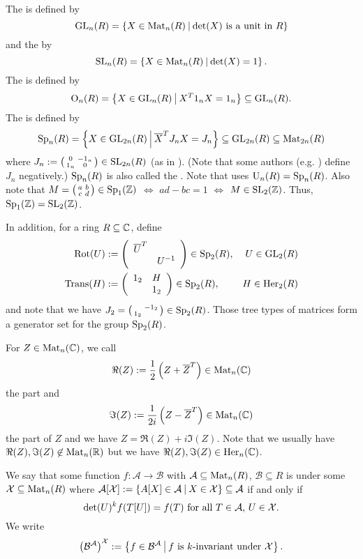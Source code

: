 The  is defined by
\[ \GL_n(R) = \Set{X \in \M_n(R)}{\text{$\det(X)$ is a unit in $R$}} \]
and the  by
\[ \SL_n(R) = \Set{X \in \M_n(R)}{\det(X) = 1} . \] %
The  is defined by
\[ \Orth_n(R) = \Set{X \in \GL_n(R)}{X^T 1_n X = 1_n} \subseteq \GL_n(R) . \] %
The  is defined by
\[ \Sp_n(R) = \Set{X \in \GL_{2n}(R)}{\overline{X}^T J_n X = J_n} \subseteq \GL_{2n}(R) \subseteq \M_{2n}(R) \] %
where $J_n := \left( \begin{smallmatrix} 0 & -1_n \\ 1_n & 0 \end{smallmatrix} \right) \in \operatorname{SL}_{2n}(R)$ (as in \cite{Dern01Herm}). (Note that some authors (e.g. \cite{PoorYuen07Comp}) define $J_n$ negatively.)
$\operatorname{Sp}_n(R)$ is also called the . Note that \cite{Dern01Herm} uses $\operatorname{U}_n(R) = \operatorname{Sp}_n(R)$.
Also note that $M = \left( \begin{smallmatrix} a & b \\ c & d \end{smallmatrix} \right) \in \operatorname{Sp}_1(\mathbb{Z})$ $\Leftrightarrow$ $ad - bc = 1$ $\Leftrightarrow$ $M \in \operatorname{SL}_2(\mathbb{Z})$. Thus, $\operatorname{Sp}_1(\mathbb{Z}) = \operatorname{SL}_2(\mathbb{Z})$. %

In addition, for a ring $R \subseteq \mathbb{C}$, define
\begin{align*}
\operatorname{Rot}(U) & := \left( \begin{array}{cc} \overline{U}^T &  \\  & U^{-1} \end{array} \right) \in \operatorname{Sp}_2(R), & U \in \operatorname{GL}_2(R) \\
\operatorname{Trans}(H) & := \left( \begin{array}{cc} 1_2 & H \\  & 1_2 \end{array} \right) \in \operatorname{Sp}_2(R),  & H \in \operatorname{Her}_2(R)
\end{align*}
and note that we have $J_2 = \left( \begin{smallmatrix}  & -1_2 \\ 1_2 &  \end{smallmatrix} \right) \in \operatorname{Sp}_2(R)$. Those tree types of matrices form a generator set for the group $\operatorname{Sp}_2(R)$.

For $Z \in \operatorname{Mat}_n(\mathbb{C})$, we call
\[ \Re(Z) := \frac{1}{2} \left(Z + \overline{Z}^{T}\right) \in \operatorname{Mat}_n(\mathbb{C}) \]
the  part and
\[ \Im(Z) := \frac{1}{2i} \left(Z - \overline{Z}^{T}\right)  \in \operatorname{Mat}_n(\mathbb{C}) \]
the  part of $Z$ and we have $Z = \Re(Z) + i \Im(Z)$.
Note that we usually have $\Re(Z),\Im(Z) \not\in \operatorname{Mat}_n(\mathbb{R})$ but we have $\Re(Z),\Im(Z) \in \operatorname{Her}_n(\mathbb{C})$.

We say that some function $f \colon \mathcal{A} \rightarrow \mathcal{B}$ with $\mathcal{A} \subseteq \operatorname{Mat}_n(R)$, $\mathcal{B} \subseteq R$ is  under some $\mathcal{X} \subseteq \operatorname{Mat}_n(R)$ where $\mathcal{A}[\mathcal{X}] := \Set{A[X] \in \mathcal{A}}{X \in \mathcal{X}} \subseteq \mathcal{A}$ if and only if
\[ \det(U)^k f(T[U]) = f(T)$ for all $T \in \mathcal{A}$, $U \in \mathcal{X} . \]
We write
\[ \invar{\mathcal{B}^\mathcal{A}}{\mathcal{X}} := \Set{f \in \mathcal{B}^\mathcal{A}}{\text{$f$ is $k$-invariant under $\mathcal{X}$}} .\]

